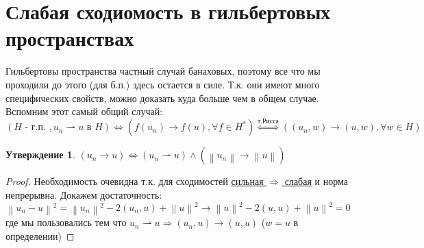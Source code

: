 \documentclass[12pt,a4paper]{article}
\theoremstyle{definition}
\newtheorem{proposition}{Утверждение}[section]
\newcommand{\norm}[1]{\left\lVert#1\right\rVert}
\newcommand{\weakto}{\rightharpoonup}
\begin{document}
\section{Слабая сходиомость в гильбертовых пространствах}
Гильбертовы пространства частный случай банаховых, поэтому все что мы проходили до этого (для б.п.) здесь остается в силе. Т.к. они имеют много специфических свойств, можно доказать куда больше чем в общем случае. Вспомним этот самый общий случай:
\begin{equation*}
	(H \text{ - г.п. }, u_n \weakto u \text{ в } H) \Leftrightarrow
	\left(f(u_n) \to f(u), \forall f \in H^*\right) \overset{\hyperref[th:2]{т. Рисса}}{\Leftrightarrow} \left((u_n, w) \to (u, w), \forall w \in H\right)
\end{equation*}

\begin{proposition}
	$(u_n \to u) \Leftrightarrow (u_n \weakto u) \wedge (\norm{u_n} \to \norm{u})$
\end{proposition}
\begin{proof}
	Необходимость очевидна т.к. для сходимостей \hyperref[th:4]{сильная $\Rightarrow$ слабая} и норма непрерывна. Докажем достаточность:
	\begin{equation*}
		\norm{u_n - u}^2 = \norm{u_n}^2 - 2(u_n, u) + \norm{u}^2 \to \norm{u}^2 - 2(u, u) + \norm{u}^2 = 0
	\end{equation*}
	где мы пользовались тем что $u_n \weakto u \Rightarrow (u_n, u) \to (u, u)$ ($w = u$ в определении)
\end{proof}
\end{document}
